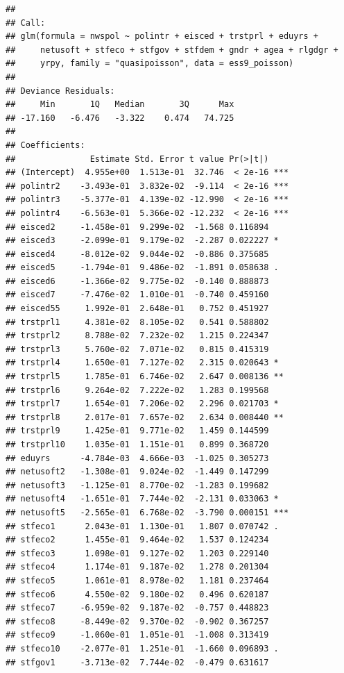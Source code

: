 \documentclass[
]{article}
\begin{document}
\begin{verbatim}
## 
## Call:
## glm(formula = nwspol ~ polintr + eisced + trstprl + eduyrs + 
##     netusoft + stfeco + stfgov + stfdem + gndr + agea + rlgdgr + 
##     yrpy, family = "quasipoisson", data = ess9_poisson)
## 
## Deviance Residuals: 
##     Min       1Q   Median       3Q      Max  
## -17.160   -6.476   -3.322    0.474   74.725  
## 
## Coefficients:
##               Estimate Std. Error t value Pr(>|t|)    
## (Intercept)  4.955e+00  1.513e-01  32.746  < 2e-16 ***
## polintr2    -3.493e-01  3.832e-02  -9.114  < 2e-16 ***
## polintr3    -5.377e-01  4.139e-02 -12.990  < 2e-16 ***
## polintr4    -6.563e-01  5.366e-02 -12.232  < 2e-16 ***
## eisced2     -1.458e-01  9.299e-02  -1.568 0.116894    
## eisced3     -2.099e-01  9.179e-02  -2.287 0.022227 *  
## eisced4     -8.012e-02  9.044e-02  -0.886 0.375685    
## eisced5     -1.794e-01  9.486e-02  -1.891 0.058638 .  
## eisced6     -1.366e-02  9.775e-02  -0.140 0.888873    
## eisced7     -7.476e-02  1.010e-01  -0.740 0.459160    
## eisced55     1.992e-01  2.648e-01   0.752 0.451927    
## trstprl1     4.381e-02  8.105e-02   0.541 0.588802    
## trstprl2     8.788e-02  7.232e-02   1.215 0.224347    
## trstprl3     5.760e-02  7.071e-02   0.815 0.415319    
## trstprl4     1.650e-01  7.127e-02   2.315 0.020643 *  
## trstprl5     1.785e-01  6.746e-02   2.647 0.008136 ** 
## trstprl6     9.264e-02  7.222e-02   1.283 0.199568    
## trstprl7     1.654e-01  7.206e-02   2.296 0.021703 *  
## trstprl8     2.017e-01  7.657e-02   2.634 0.008440 ** 
## trstprl9     1.425e-01  9.771e-02   1.459 0.144599    
## trstprl10    1.035e-01  1.151e-01   0.899 0.368720    
## eduyrs      -4.784e-03  4.666e-03  -1.025 0.305273    
## netusoft2   -1.308e-01  9.024e-02  -1.449 0.147299    
## netusoft3   -1.125e-01  8.770e-02  -1.283 0.199682    
## netusoft4   -1.651e-01  7.744e-02  -2.131 0.033063 *  
## netusoft5   -2.565e-01  6.768e-02  -3.790 0.000151 ***
## stfeco1      2.043e-01  1.130e-01   1.807 0.070742 .  
## stfeco2      1.455e-01  9.464e-02   1.537 0.124234    
## stfeco3      1.098e-01  9.127e-02   1.203 0.229140    
## stfeco4      1.174e-01  9.187e-02   1.278 0.201304    
## stfeco5      1.061e-01  8.978e-02   1.181 0.237464    
## stfeco6      4.550e-02  9.180e-02   0.496 0.620187    
## stfeco7     -6.959e-02  9.187e-02  -0.757 0.448823    
## stfeco8     -8.449e-02  9.370e-02  -0.902 0.367257    
## stfeco9     -1.060e-01  1.051e-01  -1.008 0.313419    
## stfeco10    -2.077e-01  1.251e-01  -1.660 0.096893 .  
## stfgov1     -3.713e-02  7.744e-02  -0.479 0.631617    

\end{verbatim}
\end{document}
